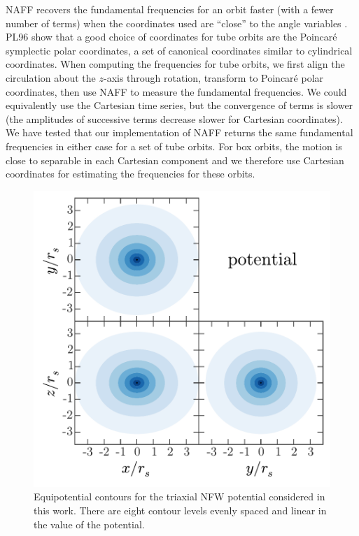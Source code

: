 \documentclass[letterpaper,12pt,preprint]{aastex}
\begin{document}
NAFF recovers the fundamental frequencies for an orbit faster (with a fewer number of terms) when the coordinates used are ``close'' to the angle variables \cite[PL96;][]{papaphilippou96}. PL96 show that a good choice of coordinates for tube orbits are the Poincar\'e symplectic polar coordinates, a set of canonical coordinates similar to cylindrical coordinates. When computing the frequencies for tube orbits, we first align the circulation about the $z$-axis through rotation, transform to Poincar\'e polar coordinates, then use NAFF to measure the fundamental frequencies. We could equivalently use the Cartesian time series, but the convergence of terms is slower (the amplitudes of successive terms decrease slower for Cartesian coordinates). We have tested that our implementation of NAFF returns the same fundamental frequencies in either case for a set of tube orbits. For box orbits, the motion is close to separable in each Cartesian component and we therefore use Cartesian coordinates for estimating the frequencies for these orbits.

\begin{figure}[!p]
\begin{center}
\includegraphics[width=\textwidth]{figures/potential.pdf}
\caption{Equipotential contours for the triaxial NFW potential considered in this work. There are eight contour levels evenly spaced and linear in the value of the potential. } \label{fig:potential}
\end{center}
\end{figure}
\end{document}
